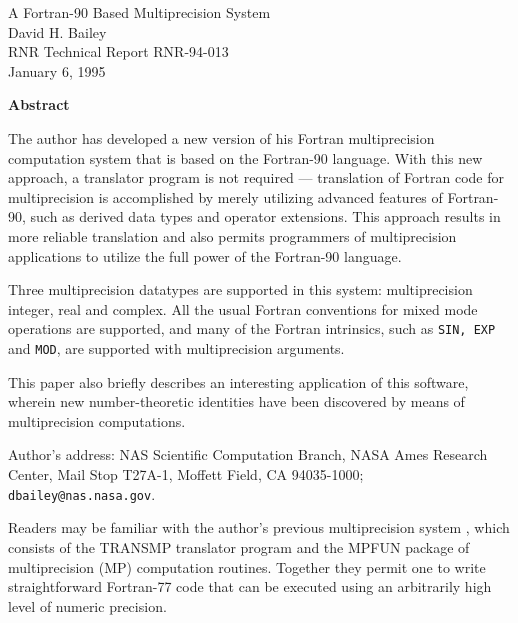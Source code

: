 \setlength{\oddsidemargin}{0cm}
\setlength{\textwidth}{16.2cm}
\setlength{\columnwidth}{16.2cm}
\setlength{\topmargin}{0cm}
\setlength{\textheight}{21.5cm}



\vspace*{2.7cm}
\begin{large} \begin{center}
A Fortran-90 Based Multiprecision System \\
David H. Bailey \\ 
RNR Technical Report RNR-94-013 \\
January 6, 1995
\end{center} \end{large}

\vspace{3ex} \noindent
{\bf Abstract}

The author has developed a new version of his Fortran multiprecision
computation system that is based on the Fortran-90 language.  With
this new approach, a translator program is not required ---
translation of Fortran code for multiprecision is accomplished by
merely utilizing advanced features of Fortran-90, such as derived data
types and operator extensions.  This approach results in more reliable
translation and also permits programmers of multiprecision
applications to utilize the full power of the Fortran-90 language.

Three multiprecision datatypes are supported in this system:
multiprecision integer, real and complex.  All the usual Fortran
conventions for mixed mode operations are supported, and many of the
Fortran intrinsics, such as {\tt SIN, EXP} and {\tt MOD}, are
supported with multiprecision arguments.

This paper also briefly describes an interesting application of this
software, wherein new number-theoretic identities have been discovered
by means of multiprecision computations.

\vfill{
Author's address: NAS Scientific Computation Branch, NASA Ames
Research Center, Mail Stop T27A-1, Moffett Field, CA 94035-1000; {\tt
dbailey@nas.nasa.gov}.}

\newpage
{}

Readers may be familiar with the author's previous multiprecision
system \cite{dhb-mp}, which consists of the TRANSMP translator program
and the MPFUN package of multiprecision (MP) computation routines.
Together they permit one to write straightforward Fortran-77 code that
can be executed using an arbitrarily high level of numeric precision.


